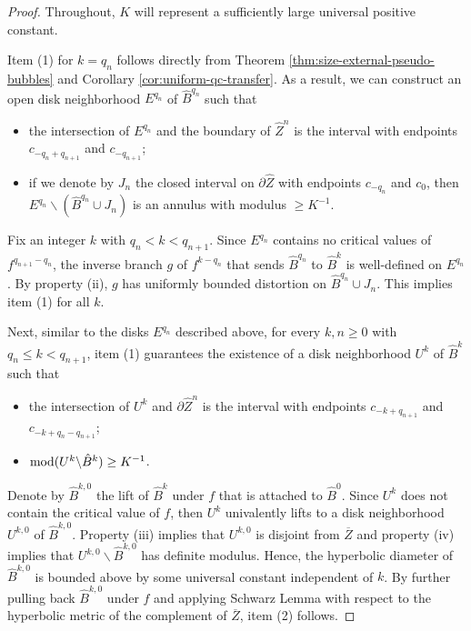 \documentclass{amsart}
\begin{document}
\begin{proof}
    Throughout, $K$ will represent a sufficiently large universal positive constant.  
    
    Item (1) for $k=q_n$ follows directly from Theorem \ref{thm:size-external-pseudo-bubbles} and Corollary \ref{cor:uniform-qc-transfer}.
    As a result, we can construct an open disk neighborhood $E^{q_n}$ of $\hat{B}^{q_n}$ such that 
    \begin{itemize}
        \item[(i)] the intersection of $E^{q_n}$ and the boundary of $\hat{Z}^{n}$ is the interval with endpoints $c_{-q_n+q_{n+1}}$ and $c_{-q_{n+1}}$;
        \item[(ii)] if we denote by $J_n$ the closed interval on $\partial \hat{Z}$ with endpoints $c_{-q_n}$ and $c_{0}$, then $E^{q_n}\backslash (\hat{B}^{q_n} \cup J_n)$ is an annulus with modulus $\geq K^{-1}$.
    \end{itemize}
    Fix an integer $k$ with $q_n < k < q_{n+1}$. 
    Since $E^{q_n}$ contains no critical values of $f^{q_{n+1}-q_n}$, the inverse branch $g$ of $f^{k-q_n}$ that sends $\hat{B}^{q_n}$ to $\hat{B}^k$ is well-defined on $E^{q_n}$. 
    By property (ii), $g$ has uniformly bounded distortion on $\hat{B}^{q_n} \cup J_n$. 
    This implies item (1) for all $k$.

    Next, similar to the disks $E^{q_n}$ described above, for every $k,n \geq 0$ with $q_n \leq k < q_{n+1}$, item (1) guarantees the existence of a disk neighborhood $U^k$ of $\hat{B}^k$ such that 
    \begin{itemize}
        \item[(iii)] the intersection of $U^{k}$ and $\partial \hat{Z}^{n}$ is the interval with endpoints $c_{-k+q_{n+1}}$ and $c_{-k+q_n-q_{n+1}}$;
        \item[(iv)] $\textnormal{mod}(U^k\backslash\hat{B}^{k}) \geq K^{-1}$.
    \end{itemize}
    Denote by $\hat{B}^{k,0}$ the lift of $\hat{B}^k$ under $f$ that is attached to $\hat{B}^0$.
    Since $U^k$ does not contain the critical value of $f$, then $U^k$ univalently lifts to a disk neighborhood $U^{k,0}$ of $\hat{B}^{k,0}$. 
    Property (iii) implies that $U^{k,0}$ is disjoint from $\overline{Z}$ and property (iv) implies that $U^{k,0} \backslash \hat{B}^{k,0}$ has definite modulus. 
    Hence, the hyperbolic diameter of $\hat{B}^{k,0}$ is bounded above by some universal constant independent of $k$. 
    By further pulling back $\hat{B}^{k,0}$ under $f$ and applying Schwarz Lemma with respect to the hyperbolic metric of the complement of $\overline{Z}$, item (2) follows.
\end{proof}
\end{document}

